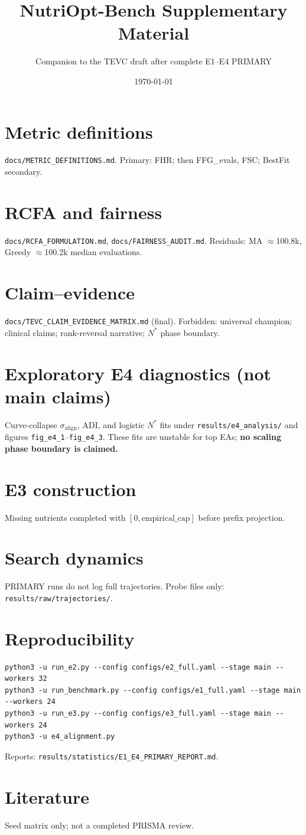 \documentclass[11pt]{article}
\title{NutriOpt-Bench Supplementary Material}
\author{Companion to the TEVC draft after complete E1--E4 PRIMARY}
\date{\today}
\begin{document}
\maketitle

\section{Metric definitions}
\texttt{docs/METRIC\_DEFINITIONS.md}. Primary: FHR; then FFG\_evals, FSC; BestFit secondary.

\section{RCFA and fairness}
\texttt{docs/RCFA\_FORMULATION.md}, \texttt{docs/FAIRNESS\_AUDIT.md}.  
Residuals: MA $\approx$100.8k, Greedy $\approx$100.2k median evaluations.

\section{Claim--evidence}
\texttt{docs/TEVC\_CLAIM\_EVIDENCE\_MATRIX.md} (final).  
Forbidden: universal champion; clinical claims; rank-reversal narrative; $N^*$ phase boundary.

\section{Exploratory E4 diagnostics (not main claims)}
Curve-collapse $\sigma_{\mathrm{align}}$, ADI, and logistic $N^*$ fits under \texttt{results/e4\_analysis/} and figures \texttt{fig\_e4\_1}--\texttt{fig\_e4\_3}.  
These fits are unstable for top EAs; \textbf{no scaling phase boundary is claimed.}

\section{E3 construction}
Missing nutrients completed with $[0,\mathrm{empirical\_cap}]$ before prefix projection.

\section{Search dynamics}
PRIMARY runs do not log full trajectories. Probe files only: \texttt{results/raw/trajectories/}.

\section{Reproducibility}
\begin{verbatim}
python3 -u run_e2.py --config configs/e2_full.yaml --stage main --workers 32
python3 -u run_benchmark.py --config configs/e1_full.yaml --stage main --workers 24
python3 -u run_e3.py --config configs/e3_full.yaml --stage main --workers 24
python3 -u e4_alignment.py
\end{verbatim}
Reports: \texttt{results/statistics/E1\_E4\_PRIMARY\_REPORT.md}.

\section{Literature}
Seed matrix only; not a completed PRISMA review.
\end{document}
